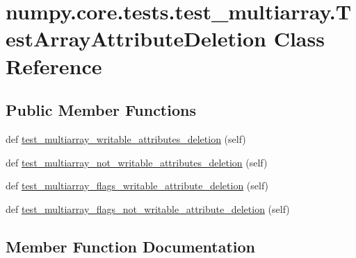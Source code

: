 \hypertarget{classnumpy_1_1core_1_1tests_1_1test__multiarray_1_1TestArrayAttributeDeletion}{}\section{numpy.\+core.\+tests.\+test\+\_\+multiarray.\+Test\+Array\+Attribute\+Deletion Class Reference}
\label{classnumpy_1_1core_1_1tests_1_1test__multiarray_1_1TestArrayAttributeDeletion}
\subsection*{Public Member Functions}
\begin{DoxyCompactItemize}
\item 
def \hyperlink{classnumpy_1_1core_1_1tests_1_1test__multiarray_1_1TestArrayAttributeDeletion_a99533ddbb3d74d1ffaf33d17c345bb7c}{test\+\_\+multiarray\+\_\+writable\+\_\+attributes\+\_\+deletion} (self)
\item 
def \hyperlink{classnumpy_1_1core_1_1tests_1_1test__multiarray_1_1TestArrayAttributeDeletion_a608ab1c74cb8482c764b14cdd9676c9e}{test\+\_\+multiarray\+\_\+not\+\_\+writable\+\_\+attributes\+\_\+deletion} (self)
\item 
def \hyperlink{classnumpy_1_1core_1_1tests_1_1test__multiarray_1_1TestArrayAttributeDeletion_a1e2f326cd213bd35b476eaaaea5c93f9}{test\+\_\+multiarray\+\_\+flags\+\_\+writable\+\_\+attribute\+\_\+deletion} (self)
\item 
def \hyperlink{classnumpy_1_1core_1_1tests_1_1test__multiarray_1_1TestArrayAttributeDeletion_a9eb344abf9568a305d448aa2fe7fc6b3}{test\+\_\+multiarray\+\_\+flags\+\_\+not\+\_\+writable\+\_\+attribute\+\_\+deletion} (self)
\end{DoxyCompactItemize}


\subsection{Member Function Documentation}
\mbox{\label{classnumpy_1_1core_1_1tests_1_1test__multiarray_1_1TestArrayAttributeDeletion_a9eb344abf9568a305d448aa2fe7fc6b3}} 
